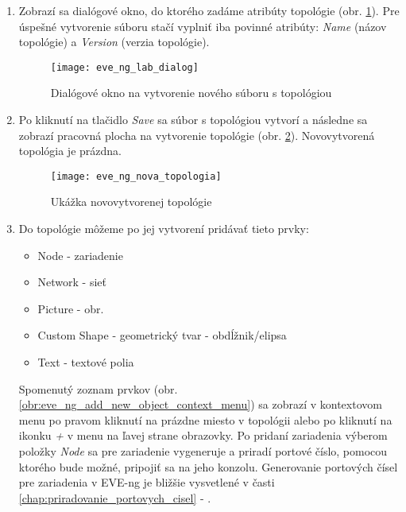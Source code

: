 \begin{enumerate}[noitemsep]
    \item Zobrazí sa dialógové okno, do ktorého zadáme atribúty topológie (obr. \ref{obr:eve_ng_lab_dialog}). Pre úspešné vytvorenie súboru stačí vyplniť iba povinné atribúty: \emph{Name} (názov topológie) a \emph{Version} (verzia topológie).

\begin{figure}
    \centering
    \texttt{[image: eve\_ng\_lab\_dialog]}
    \caption{Dialógové okno na vytvorenie nového súboru s topológiou}
    \label{obr:eve_ng_lab_dialog}
\end{figure}

    \item Po kliknutí na tlačidlo \emph{Save} sa súbor s topológiou vytvorí a následne sa zobrazí pracovná plocha na vytvorenie topológie (obr. \ref{obr:eve_ng_nova_topologia}). Novovytvorená topológia  je prázdna.

\begin{figure}
    \centering
    \texttt{[image: eve\_ng\_nova\_topologia]}
    \caption{Ukážka novovytvorenej topológie}
    \label{obr:eve_ng_nova_topologia}
\end{figure}

    \item Do topológie môžeme po jej vytvorení pridávať tieto prvky:
    
    \begin{itemize}[noitemsep]
        \item Node - zariadenie
        \item Network - sieť
        \item Picture - obr.
        \item Custom Shape - geometrický tvar - obdĺžnik/elipsa
        \item Text - textové polia
    \end{itemize}
    
    Spomenutý zoznam prvkov (obr. \ref{obr:eve_ng_add_new_object_context_menu}) sa zobrazí v kontextovom menu po pravom kliknutí na prázdne miesto v topológii alebo po kliknutí na ikonku \emph{+} v menu na ľavej strane obrazovky. Po pridaní zariadenia výberom položky \emph{Node} sa pre zariadenie vygeneruje a priradí portové číslo, pomocou ktorého bude možné, pripojiť sa na jeho konzolu. Generovanie portových čísel pre zariadenia v EVE-ng je bližšie vysvetlené v časti \ref{chap:priradovanie_portovych_cisel} - .


\end{enumerate}
